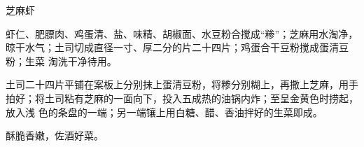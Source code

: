 \begin{recipe}{芝麻虾}

\ingredients


\preparation

\step 虾仁、肥膘肉、鸡蛋清、盐、味精、胡椒面、水豆粉合搅成“糁”；芝麻用水淘净，
晾干水气；土司切成直径一寸、厚二分的片二十四片；鸡蛋合干豆粉搅成蛋清豆粉；生菜
淘洗干净待用。

\step 土司二十四片平铺在案板上分别抹上蛋清豆粉，将糁分别糊上，再撒上芝麻，用手
拍好；将土司粘有芝麻的一面向下，投入五成热的油锅内炸；至呈金黄色时捞起，放入浅
色的条盘的一端；另一端镶上用白糖、醋、香油拌好的生菜即成。

\features

酥脆香嫩，佐酒好菜。

\end{recipe}

